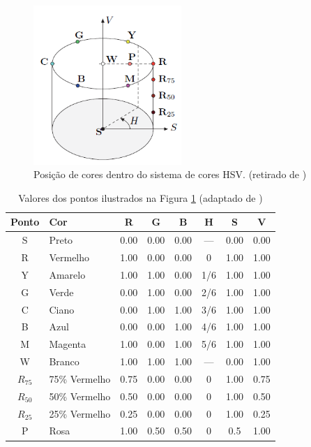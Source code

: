 \documentclass[	12pt, Times, openright, twoside, a4paper, english, brazil]{abntex2}
\begin{document}
\begin{figure}[!htb]
\centering \includegraphics[width=0.5\textwidth]{figuraHSV2.png}
\caption{Posição de cores dentro do sistema de cores HSV. (retirado de ) \label{fig:figuraHSV2}}
\end{figure}

\begin{table}[h]
\centering
\begin{tabular}{clcccccc}
\hline      

\textbf{Ponto} & \textbf{Cor}              & \textbf{R} & \textbf{G} & \textbf{B} & \textbf{H} & \textbf{S} & \textbf{V}      \\ \hline
            S 	& Preto 		&0.00 	&0.00 	&0.00 	&— 	&0.00 	&0.00	\\ \hline
            R 	& Vermelho 		&1.00 	&0.00 	&0.00 	&0 	&1.00 	&1.00	\\ \hline
            Y 	&Amarelo 	&1.00 	&1.00 	&0.00 	&1/6 &1.00 	&1.00	\\ \hline
            G 	&Verde 		&0.00 	&1.00 	&0.00 	&2/6 &1.00 	&1.00	\\ \hline
            C 	&Ciano 		&0.00 	&1.00 	&1.00 	&3/6 &1.00 	&1.00	\\ \hline
            B 	&Azul 		&0.00 	&0.00 	&1.00 	&4/6 &1.00 	&1.00	\\ \hline
            M 	&Magenta 	&1.00 	&0.00 	&1.00 	&5/6 &1.00 	&1.00	\\ \hline
            W 	&Branco 		&1.00 	&1.00 	&1.00 	&— 	&0.00 	&1.00	\\ \hline
            $R_75$ &75\% Vermelho 	&0.75 	&0.00 	&0.00 	&0 	&1.00 	&0.75	\\ \hline
            $R_50$ &50\% Vermelho 	&0.50 	&0.00 	&0.00 	&0 	&1.00 	&0.50	\\ \hline
            $R_25$ &25\% Vermelho 	&0.25 	&0.00 	&0.00 	&0 	&1.00 	&0.25	\\ \hline
            P 	&Rosa 		&1.00 	&0.50 	&0.50 	&0 	&0.5 	&1.00	\\ \hline

\end{tabular}
\caption{Valores dos pontos ilustrados na Figura \ref{fig:figuraHSV2} (adaptado de )}
\label{tab:exemploHSV}
\end{table}
\end{document}
